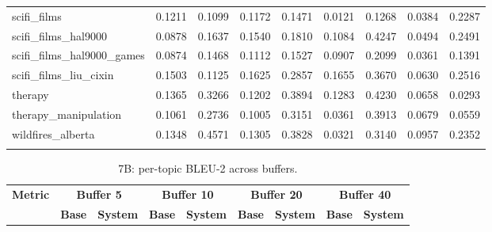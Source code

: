 \documentclass[pdflatex,sn-mathphys-num]{sn-jnl}%
\theoremstyle{thmstyleone}%
\theoremstyle{thmstyletwo}%
\theoremstyle{thmstylethree}%
\begin{document}
\begin{appendices}
\begin{landscape}
\begin{longtable}{@{}p{3.8cm}cccccccc@{}}
scifi\_films & 0.1211 & 0.1099 & 0.1172 & 0.1471 & 0.0121 & 0.1268 & 0.0384 & 0.2287 \\
scifi\_films\_hal9000 & 0.0878 & 0.1637 & 0.1540 & 0.1810 & 0.1084 & 0.4247 & 0.0494 & 0.2491 \\
scifi\_films\_hal9000\_games & 0.0874 & 0.1468 & 0.1112 & 0.1527 & 0.0907 & 0.2099 & 0.0361 & 0.1391 \\
scifi\_films\_liu\_cixin & 0.1503 & 0.1125 & 0.1625 & 0.2857 & 0.1655 & 0.3670 & 0.0630 & 0.2516 \\
therapy & 0.1365 & 0.3266 & 0.1202 & 0.3894 & 0.1283 & 0.4230 & 0.0658 & 0.0293 \\
therapy\_manipulation & 0.1061 & 0.2736 & 0.1005 & 0.3151 & 0.0361 & 0.3913 & 0.0679 & 0.0559 \\
wildfires\_alberta & 0.1348 & 0.4571 & 0.1305 & 0.3828 & 0.0321 & 0.3140 & 0.0957 & 0.2352 \\
\botrule
\end{longtable}
\normalsize
\end{landscape}
\begin{landscape}
\tiny
\begin{longtable}{@{}p{3.8cm}cccccccc@{}}
\caption{7B: per-topic BLEU-2 across buffers.}\label{tab:app_7b_bleu_topics}\\

\toprule
\textbf{Metric} & \multicolumn{2}{c}{\textbf{Buffer 5}} & \multicolumn{2}{c}{\textbf{Buffer 10}} & \multicolumn{2}{c}{\textbf{Buffer 20}} & \multicolumn{2}{c}{\textbf{Buffer 40}} \\
\cmidrule(lr){2-3}\cmidrule(lr){4-5}\cmidrule(lr){6-7}\cmidrule(lr){8-9}
 & \textbf{Base} & \textbf{System} & \textbf{Base} & \textbf{System} & \textbf{Base} & \textbf{System} & \textbf{Base} & \textbf{System} \\
\midrule
\endfirsthead


\end{longtable}
\end{landscape}
\end{appendices}
\end{document}
